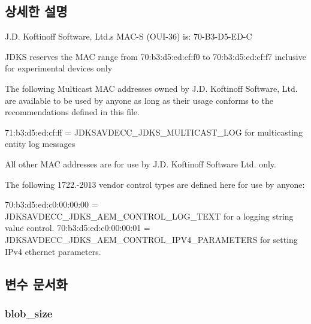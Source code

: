 \subsection{상세한 설명}
J.\+D. Koftinoff Software, Ltd.\textquotesingle{}s M\+A\+C-\/S (O\+U\+I-\/36) is\+: 70-\/\+B3-\/\+D5-\/\+E\+D-\/C

J\+D\+KS reserves the M\+AC range from 70\+:b3\+:d5\+:ed\+:cf\+:f0 to 70\+:b3\+:d5\+:ed\+:cf\+:f7 inclusive for experimental devices only

The following Multicast M\+AC addresses owned by J.\+D. Koftinoff Software, Ltd. are available to be used by anyone as long as their usage conforms to the recommendations defined in this file.

71\+:b3\+:d5\+:ed\+:cf\+:ff = J\+D\+K\+S\+A\+V\+D\+E\+C\+C\+\_\+\+J\+D\+K\+S\+\_\+\+M\+U\+L\+T\+I\+C\+A\+S\+T\+\_\+\+L\+OG for multicasting entity log messages

All other M\+AC addresses are for use by J.\+D. Koftinoff Software Ltd. only.

The following 1722.-\/2013 vendor control types are defined here for use by anyone\+:

70\+:b3\+:d5\+:ed\+:c0\+:00\+:00\+:00 = J\+D\+K\+S\+A\+V\+D\+E\+C\+C\+\_\+\+J\+D\+K\+S\+\_\+\+A\+E\+M\+\_\+\+C\+O\+N\+T\+R\+O\+L\+\_\+\+L\+O\+G\+\_\+\+T\+E\+XT for a logging string value control. 70\+:b3\+:d5\+:ed\+:c0\+:00\+:00\+:01 = J\+D\+K\+S\+A\+V\+D\+E\+C\+C\+\_\+\+J\+D\+K\+S\+\_\+\+A\+E\+M\+\_\+\+C\+O\+N\+T\+R\+O\+L\+\_\+\+I\+P\+V4\+\_\+\+P\+A\+R\+A\+M\+E\+T\+E\+RS for setting I\+Pv4 ethernet parameters. 

\subsection{변수 문서화}
\subsubsection[{\texorpdfstring{blob\+\_\+size}{blob_size}}]{ blob\+\_\+size}\hypertarget{group__jdks_ga32143551b70893faef60f6e35f88ed50}{}\label{group__jdks_ga32143551b70893faef60f6e35f88ed50}


